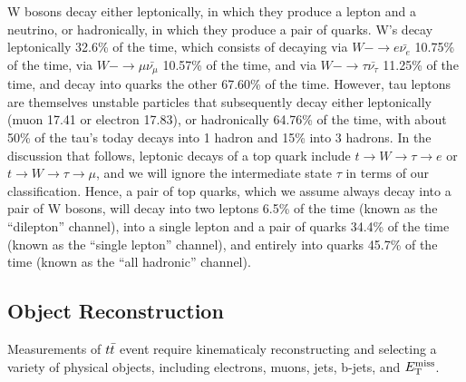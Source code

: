W bosons decay either leptonically, in which they produce a lepton and a neutrino, or hadronically, in which they produce a pair of quarks.
W's decay leptonically 32.6\% of the time, which consists of decaying via $W- \rightarrow e \bar{\nu_{e}}$ 10.75\% of the time, via $W- \rightarrow \mu \bar{\nu_{\mu}}$ 10.57\% of the time, and via $W- \rightarrow \tau \bar{\nu_{\tau}}$ 11.25\% of the time, and decay into quarks the other 67.60\% of the time. \cite{PARTICLE_DATA_GROUP}
However, tau leptons are themselves unstable particles that subsequently decay either leptonically (muon 17.41 or electron 17.83), or hadronically 64.76\% of the time, with about 50\% of the tau's today decays into 1 hadron and 15\% into 3 hadrons.
In the discussion that follows, leptonic decays of a top quark include $t \rightarrow W \rightarrow \tau \rightarrow e$ or $t \rightarrow W \rightarrow \tau \rightarrow \mu$, and we will ignore the intermediate state $\tau$ in terms of our classification.
Hence, a pair of top quarks, which we assume always decay into a pair of W bosons, will decay into two leptons 6.5\% of the time (known as the ``dilepton'' channel), into a single lepton and a pair of quarks 34.4\% of the time (known as the ``single lepton'' channel), and entirely into quarks 45.7\% of the time (known as the ``all hadronic'' channel).




\subsection{Object Reconstruction}

Measurements of $t\bar{t}$ event require kinematicaly reconstructing and selecting a variety of physical objects, including electrons, muons, jets, b-jets, and $E_{\mathrm{T}}^{\mathrm{miss}}$.

